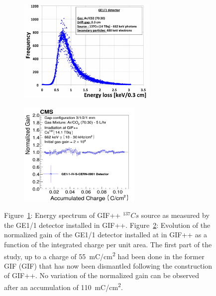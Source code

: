 	\begin{figure}[H]
		\begin{subfigure}{0.5\linewidth}
			\centering
			\includegraphics[height=5cm]{fig/chapt3/GEM-GIF-spectrum.png}
			\caption{\label{fig:GEM-longevity:A}}
		\end{subfigure}
		\begin{subfigure}{0.5\linewidth}
			\centering
			\includegraphics[height=5cm]{fig/chapt3/GEM-GIF-gain-monitor.png}
			\caption{\label{fig:GEM-longevity:B}}
		\end{subfigure}
		\caption{\label{fig:GEM-longevity} Figure~\ref{fig:GEM-longevity:A}: Energy spectrum of GIF++ $^{137}Cs$ source as measured by the GE1/1 detector installed in GIF++. Figure~\ref{fig:GEM-longevity:B}: Evolution of the normalized gain of the GE1/1 detector installed at in GIF++ as a function of the integrated charge per unit area. The first part of the study, up to a charge of \SI{55}{mC/cm^2} had been done in the former \acl{GIF} (GIF) that has now been dismantled following the construction of GIF++. No variation of the normalized gain can be observed after an accumulation of \SI{110}{mC/cm^2}.}
	\end{figure}
	
